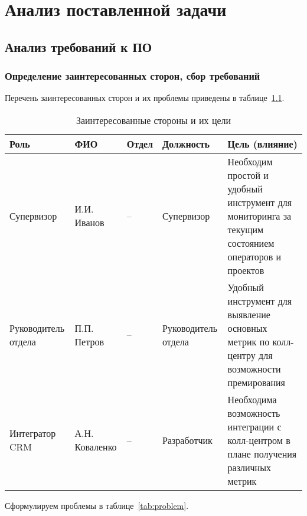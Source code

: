 \chapter{Анализ поставленной задачи}
\label{ch:analysis}

\section{Анализ требований к ПО}

\subsection{Определение заинтересованных сторон, сбор требований} %

Перечень заинтересованных сторон и их проблемы приведены в таблице~\ref{tab:itrppl}.

\begin{table}[ht]
    \caption{Заинтересованные стороны и их цели}
    \begin{small}
    \begin{tabular}{|p{}|p{}|p{}|p{}   |p{}|}
        \hline
        Роль                          & ФИО            & Отдел          & Должность          & Цель (влияние) \\
        \hline
        Супервизор                    & И.И. Иванов    & --             & Супервизор         & Необходим простой и удобный инструмент для мониторинга за текущим состоянием операторов и проектов       \\
        \hline
        Руководитель отдела           & П.П. Петров    & --             & Руководитель отдела& Удобный инструмент для выявление основных метрик по колл-центру для возможности премирования         \\
        \hline
        Интегратор CRM                & А.Н. Коваленко & --             & Разработчик        & Необходима возможность интеграции с колл-центром в плане получения различных метрик         \\
        \hline
    \end{tabular}
    \end{small}
    \label{tab:itrppl}
\end{table}

Сформулируем проблемы в таблице~\ref{tab:problem}.

